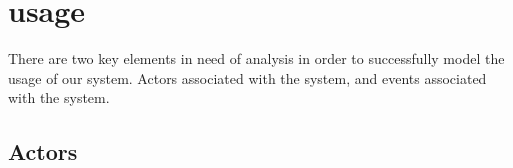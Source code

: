 \section{usage}

There are two key elements in need of analysis in order to successfully model the usage of our system. Actors associated with the system, and events associated with the system.

\subsection{Actors}


